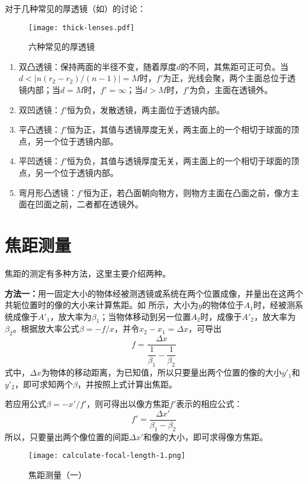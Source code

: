 \documentclass[cn,10pt,chinesefont=founder,math=newtx,cite=super,twoside]{elegantbook}
\begin{document}
对于几种常见的厚透镜（如）的讨论：
\begin{figure}[htbp]
	\centering
	\texttt{[image: thick-lenses.pdf]}
	\caption{六种常见的厚透镜}
	\label{fig:thick-lenses}
\end{figure}
\begin{enumerate}
	\item 双凸透镜：保持两面的半径不变，随着厚度$d$的不同，其焦距可正可负。当$d<|n(r_2-r_2)/(n-1)|=M$时，$f'$为正，光线会聚，两个主面总位于透镜内部；当$d=M$时，$f'=\infty$；当$d>M$时，$f'$为负，主面在透镜外。
	\item 双凹透镜：$f'$恒为负，发散透镜，两主面位于透镜内部。
	\item 平凸透镜：$f'$恒为正，其值与透镜厚度无关，两主面上的一个相切于球面的顶点，另一个位于透镜内部。
	\item 平凹透镜：$f'$恒为负，其值与透镜厚度无关，两主面上的一个相切于球面的顶点，另一个位于透镜内部。
	\item 弯月形凸透镜：$f'$恒为正，若凸面朝向物方，则物方主面在凸面之前，像方主面在凹面之前，二者都在透镜外。
\end{enumerate}

\section{焦距测量}
焦距的测定有多种方法，这里主要介绍两种。

\textbf{方法一：}用一固定大小的物体经被测透镜或系统在两个位置成像，并量出在这两个共轭位置时的像的大小来计算焦距。如 所示，大小为$y$的物体位于$A_1$时，经被测系统成像于$A'_1$，放大率为$\beta_1$；当物体移动到另一位置$A_2$时，成像于$A'_2$，放大率为$\beta_2$。根据放大率公式$\beta=-f/x$，并令$x_2-x_1=\Delta x$，可导出
\begin{equation}
f=\frac{\Delta x}{\dfrac{1}{\beta_1}-\dfrac{1}{\beta_2}}
\end{equation}
式中，$\Delta x$为物体的移动距离，为已知值，所以只要量出两个位置的像的大小$y'_1$和$y'_2$，即可求知两个$\beta$，并按照上式计算出焦距。

若应用公式$\beta=-x'/f'$，则可得出以像方焦距$f'$表示的相应公式：
\begin{equation}
f'=\frac{\Delta x'}{\beta_1-\beta_2}
\end{equation}
所以，只要量出两个像位置的间距$\Delta x'$和像的大小，即可求得像方焦距。

\begin{figure}[htbp]
	\centering
	\texttt{[image: calculate-focal-length-1.png]}
	\caption{焦距测量（一）}
	\label{fig:calculate-focal-length-1}
\end{figure}
\end{document}
